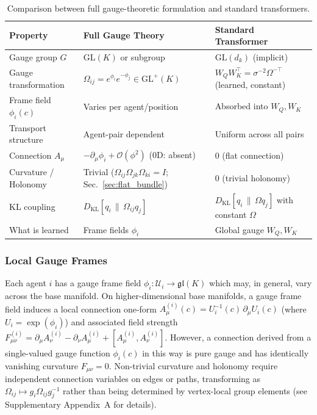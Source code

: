 \documentclass[twoside,11pt]{article}
\begin{document}
\begin{table}[h]
\centering
\renewcommand{\arraystretch}{1.2}
\setlength{\tabcolsep}{6pt}
\begin{tabularx}{\textwidth}{lXX}
\hline
\textbf{Property} &
\textbf{Full Gauge Theory} &
\textbf{Standard Transformer} \\
\hline
Gauge group $G$ &
$\mathrm{GL}(K)$ or subgroup &
$\mathrm{GL}(d_k)$ (implicit) \\
Gauge transformation &
$\Omega_{ij} = e^{\phi_i} e^{-\phi_j} \in \mathrm{GL}^+(K)$ &
$W_Q W_K^\top = \sigma^{-2}\Omega^{-\top}$ (learned, constant) \\
Frame field $\phi_i(c)$ &
Varies per agent/position &
Absorbed into $W_Q, W_K$ \\
Transport structure &
Agent-pair dependent &
Uniform across all pairs \\
Connection $A_\mu$ &
$-\partial_\mu \phi_i + \mathcal{O}(\phi^2)$ (0D: absent) &
$0$ (flat connection) \\
Curvature / Holonomy &
Trivial ($\Omega_{ij}\Omega_{jk}\Omega_{ki} = I$; Sec.~\ref{sec:flat_bundle}) &
$0$ (trivial holonomy) \\
KL coupling &
$D_{\text{KL}}[q_i \,\|\, \Omega_{ij} q_j]$ &
$D_{\text{KL}}[q_i \,\|\, \Omega q_j]$ with constant $\Omega$ \\
What is learned &
Frame fields $\phi_i$ &
Global gauge $W_Q, W_K$ \\
\hline
\end{tabularx}
\caption{Comparison between full gauge-theoretic formulation and standard transformers.}
\label{tab:gauge_vs_transformer}
\end{table}





\subsubsection{Local Gauge Frames}
Each agent $i$ has a gauge frame field $\phi_i: \mathcal{U}_i \to \mathfrak{gl}(K)$ which may, in general, vary across the base manifold. On higher-dimensional base manifolds, a gauge frame field induces a local connection one-form $A^{(i)}_\mu(c) = U_i^{-1}(c)\,\partial_\mu U_i(c)$ (where $U_i = \exp(\phi_i)$) and associated field strength $F^{(i)}_{\mu\nu} = \partial_\mu A^{(i)}_\nu - \partial_\nu A^{(i)}_\mu + [A^{(i)}_\mu, A^{(i)}_\nu]$. However, a connection derived from a single-valued gauge function $\phi_i(c)$ in this way is pure gauge and has identically vanishing curvature $F_{\mu\nu} = 0$. Non-trivial curvature and holonomy require independent connection variables on edges or paths, transforming as $\Omega_{ij} \mapsto g_i \Omega_{ij} g_j^{-1}$ rather than being determined by vertex-local group elements (see Supplementary Appendix~A for details).
\end{document}
